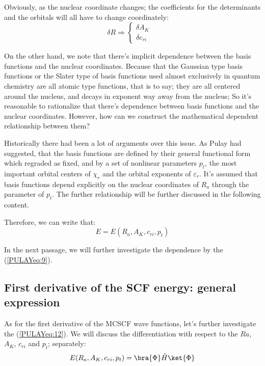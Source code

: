 Obviously, as the nuclear coordinate changes; the coefficients for the
determinants and the orbitals will all have to change coordinately:
\begin{equation}\label{}
  \delta R \Rightarrow \left\{
    \begin{array}{ll}
      \delta A_{K}   &   \\
      \delta c_{ri}  &
    \end{array}
  \right.
\end{equation}

On the other hand, we note that there's implicit dependence between
the basis functions and the nuclear coordinates. Because that the
Gaussian type basis functions or the Slater type of basis functions
used almost exclusively in quantum chemistry are all atomic type
functions, that is to say; they are all centered around the nucleus,
and decays in exponent way away from the nucleus; So it's reasonable
to rationalize that there's dependence between basis functions and the
nuclear coordinates. However, how can we construct the mathematical
dependent relationship between them?

Historically there had been a lot of arguments over this
issue\cite{meyer:2109, bishop:3515}. As Pulay had
suggested\cite{Pulay5}, that the basis functions are defined by their
general functional form which regraded as fixed, and by a set of
nonlinear parameters $p_{t}$, the most important orbital centers of
$\chi_{r}$ and the orbital exponents of $\varepsilon_{r}$. It's
assumed that basis functions depend explicitly on the nuclear
coordinates of $R_{a}$ through the parameter of $p_{t}$. The further
relationship will be further discussed in the following content.

Therefore, we can write that:
\begin{equation}\label{PULAYeq:12}
  E = E(R_{a}, A_{K}, c_{ri}, p_{t})
\end{equation}

In the next passage, we will further investigate the dependence by the
(\ref{PULAYeq:9}).

\subsection{First derivative of the SCF energy: general expression}
%
%
%
As for the first derivative of the MCSCF wave functions, let's further
investigate the (\ref{PULAYeq:12}). We will discuss the
differentiation with respect to the $Ra$, $A_{K}$, $c_{ri}$ and
$p_{t}$; separately:
\begin{equation}\label{}
  E(R_{a}, A_{K}, c_{ri}, p_{t}) = \bra{\Phi}\hat{H}\ket{\Phi}
\end{equation}

